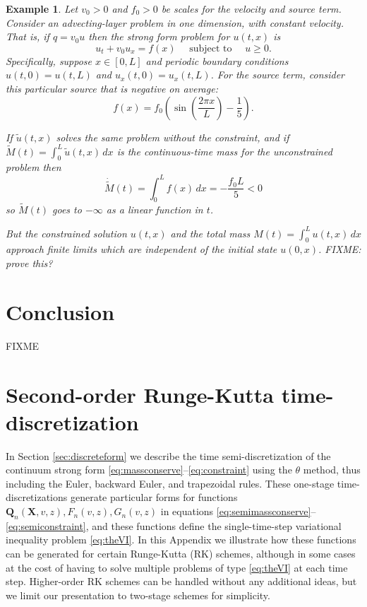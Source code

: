 \documentclass[final,leqno,onefignum,onetabnum]{siamltex1213bueler}
\newtheorem{example}{Example}
\newcommand\bQ{\mathbf{Q}}
\newcommand\bX{\mathbf{X}}
\begin{document}
\begin{example}  Let $v_0>0$ and $f_0>0$ be scales for the velocity and source term.  Consider an advecting-layer problem in one dimension, with constant velocity.  That is, if $q = v_0 u$ then the strong form problem for $u(t,x)$ is
\begin{equation}
u_t + v_0 u_x = f(x) \quad \text{ subject to } \quad u\ge 0.  \label{eq:ex:advectlayer}
\end{equation}
Specifically, suppose $x\in[0,L]$ and periodic boundary conditions $u(t,0)=u(t,L)$ and $u_x(t,0)=u_x(t,L)$.  For the source term, consider this particular source that is negative on average:
    $$f(x) = f_0 \left(\sin\left(\frac{2\pi x}{L}\right) - \frac{1}{5}\right).$$

If $\tilde u(t,x)$ solves the same problem without the constraint, and if $\tilde M(t) = \int_0^L \tilde u(t,x)\,dx$ is the continuous-time mass for the unconstrained problem then
    $$\dot{\tilde M}(t) = \int_0^L f(x)\,dx = -\frac{f_0 L}{5} < 0$$
so $\tilde M(t)$ goes to $-\infty$ as a linear function in $t$.

But the constrained solution $u(t,x)$ and the total mass $M(t) = \int_0^L u(t,x)\,dx$ approach finite limits which are independent of the initial state $u(0,x)$.  FIXME: prove this?
\end{example}

\section{Conclusion} \label{sec:conclusion}  FIXME






\appendix

\section{Second-order Runge-Kutta time-discretization}   In Section \ref{sec:discreteform} we describe the time semi-discretization of the continuum strong form \eqref{eq:massconserve}--\eqref{eq:constraint} using the $\theta$ method, thus including the Euler, backward Euler, and trapezoidal rules.  These one-stage time-discretizations generate particular forms for functions $\bQ_n(\bX,v,z),F_n(v,z),G_n(v,z)$ in equations \eqref{eq:semimassconserve}--\eqref{eq:semiconstraint}, and these functions define the single-time-step variational inequality problem \eqref{eq:theVI}.  In this Appendix we illustrate how these functions can be generated for certain Runge-Kutta (RK) schemes, although in some cases at the cost of having to solve multiple problems of type \eqref{eq:theVI} at each time step.  Higher-order RK schemes can be handled without any additional ideas, but we limit our presentation to two-stage schemes for simplicity.
\end{document}
